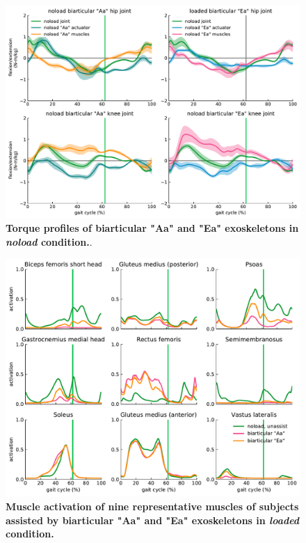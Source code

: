 \documentclass[10pt,letterpaper]{article}
\begin{document}
\vspace*{0.2in}
{\Large\textbf{} %
}
\vspace{1in}
\begin{figure}[ht]   
	\centering
	\includegraphics[width=\linewidth]{Case_Studies/NoloadBi01_NoloadBi21/PaperFigure_TorqueProfiles.pdf}
	\vspace{1mm}
	\caption{\small{\textbf{Torque profiles of biarticular "Aa" and "Ea" exoskeletons in {\it noload} condition.}}.}
	\label{Fig_TorqueProfiles_Biarticular}
\end{figure}
\begin{figure}[ht]   
	\centering
	\includegraphics[width=\linewidth]{Case_Studies/NoloadBi01_NoloadBi21/Biarticular_AaVsEa_MusclesActivation.pdf}
	\vspace{1mm}
	\caption{\small{\textbf{Muscle activation of nine representative muscles of subjects assisted by biarticular "Aa" and "Ea" exoskeletons in {\it loaded} condition.  }}}
	\label{Fig_MuscleActivation_Biarticular}
\end{figure}
\end{document}
